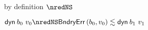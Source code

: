 {\begin{lamportproof*}
    \begin{pfproof}
        \begin{pfproof}
            \begin{pfproof}
              by definition $\nredNS$
            \end{pfproof}
          \qedstep
            \begin{pfproof}
              \begin{mathpar}
              \end{mathpar}
            \end{pfproof}
        \end{pfproof}
        \begin{pfproof}
          \qedstep
            \begin{pfproof}
              $\edynb{\sbnd_0}{\svalue_0} \nredNS \rexpr{\boundaryerror{\sbnd_0}{\svalue_0}}{\edynb{\sbnd_1}{\svalue_1}}$
            \end{pfproof}
        \end{pfproof}
    \end{pfproof}


\end{lamportproof*}}
